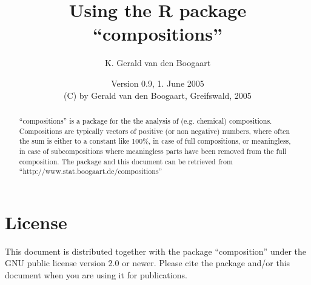 \documentclass{article}
\author{K. Gerald van den Boogaart}
\title{Using the R package ``compositions''}
\date{Version 0.9, 1. June 2005\\
(C) by Gerald van den Boogaart, Greifswald, 2005}
\begin{document}
\maketitle
\begin{abstract}
  ``compositions'' is a package for the the analysis of (e.g. chemical)
  compositions. Compositions are typically vectors of positive (or non
  negative) numbers, where often the sum is either to a constant like 100\%,
  in case of full compositions, or meaningless, in case of subcompositions
  where meaningless parts have been removed from the full composition. The
  package and this document can be retrieved from
  ``http://www.stat.boogaart.de/compositions''
\end{abstract}
\section{License}
This document is distributed together with the package ``composition'' under
the GNU public license version 2.0 or newer. Please cite the package and/or
this document when you are using it for publications.
\end{document}
